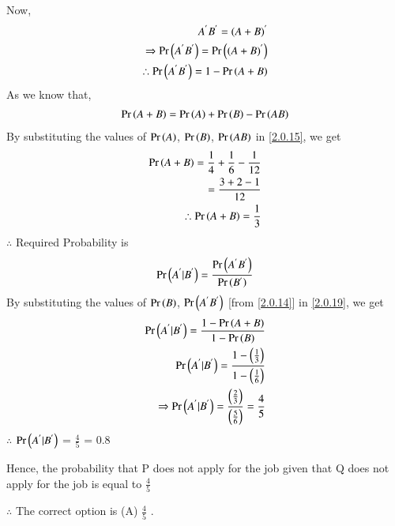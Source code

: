 \documentclass[journal,12pt,twocolumn]{IEEEtran}
\begin{document}
Now,
\begin{align}
A^{'}B^{'} = (A + B)^{'} \\
\Rightarrow \Pr\left(A^{'}B^{'}\right) = \Pr\left((A + B)^{'}\right) \\
\therefore \Pr\left(A^{'}B^{'}\right) = 1 - \Pr\left(A + B\right) \label{2.0.14}
\end{align}
As we know that,
\begin{align}
\Pr\left(A+B\right) = \Pr\left(A\right) + \Pr\left(B\right) - \Pr\left(AB\right) \label{2.0.15}
\end{align}
By substituting the values of $\Pr\left(A\right)$, $\Pr\left(B\right)$, $\Pr\left(AB\right)$ in \eqref{2.0.15}, we get
\begin{align}
\Pr\left(A+B\right) = \frac{1}{4} + \frac{1}{6} - \frac{1}{12} \\
= \frac{3 + 2 - 1}{12} \\
\therefore \Pr\left(A+B\right) = \frac{1}{3}
\end{align}
$\therefore$ Required Probability is 
\begin{align}
\Pr\left(A^{'}|B^{'}\right) = \frac{\Pr\left(A^{'}B^{'}\right)}{\Pr\left(B^{'}\right)} \label{2.0.19}   
\end{align}
By substituting the values of $\Pr\left(B\right)$, $\Pr\left(A^{'}B^{'}\right)$ [from \eqref{2.0.14}] in \eqref{2.0.19}, we get
\begin{align}
\Pr\left(A^{'}|B^{'}\right) = \frac{1 - \Pr\left(A + B\right)}{1 - \Pr\left(B\right)} \\
\Pr\left(A^{'}|B^{'}\right) = \frac{1 - \left(\frac{1}{3} \right)}{1 - \left(\frac{1}{6} \right)} \\
\Rightarrow \Pr\left(A^{'}|B^{'}\right) = \frac{\left(\frac{2}{3} \right)}{\left(\frac{5}{6} \right)} = \frac{4}{5}\\
\end{align}
$\therefore$ $\Pr\left(A^{'}|B^{'}\right)$ = $\frac{4}{5}$ = 0.8

Hence, the probability that P does not apply for the job given that Q does not apply for the job is equal to $\frac{4}{5}$

$\therefore$ The correct option is (A) $\frac{4}{5}$ .
\end{document}
